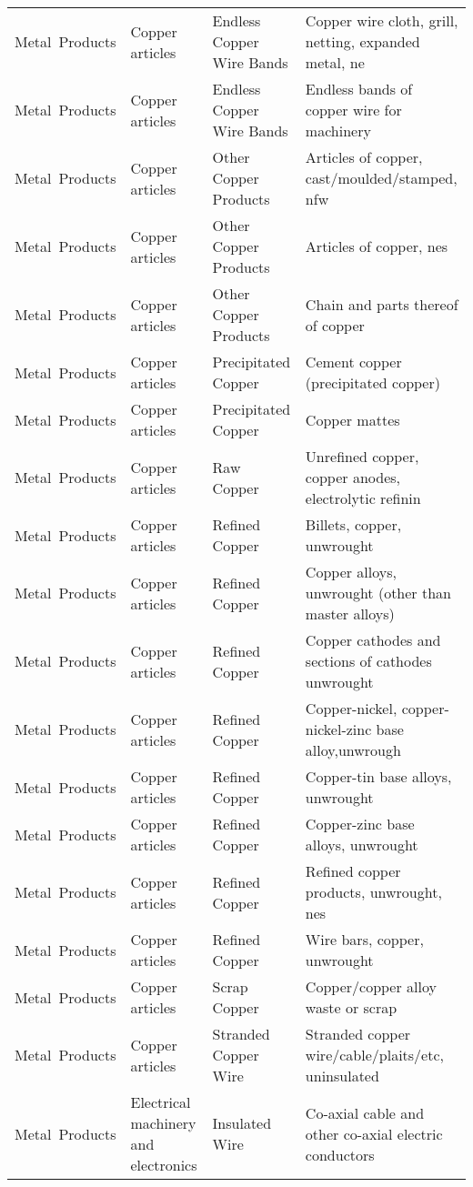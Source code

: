 \begin{appendices}
\begin{xltabular}{\textwidth}{|p{0.10\textwidth}|p{0.25\textwidth}|p{0.20\textwidth}|p{0.35\textwidth}|}
		Metal\ Products & Copper articles & Endless Copper Wire Bands & Copper wire cloth, grill, netting, expanded metal, ne \\
		Metal\ Products & Copper articles & Endless Copper Wire Bands & Endless bands of copper wire for machinery \\
		Metal\ Products & Copper articles & Other Copper Products & Articles of copper, cast/moulded/stamped, nfw \\
		Metal\ Products & Copper articles & Other Copper Products & Articles of copper, nes \\
		Metal\ Products & Copper articles & Other Copper Products & Chain and parts thereof of copper \\
		Metal\ Products & Copper articles & Precipitated Copper & Cement copper (precipitated copper) \\
		Metal\ Products & Copper articles & Precipitated Copper & Copper mattes \\
		Metal\ Products & Copper articles & Raw Copper & Unrefined copper, copper anodes, electrolytic refinin \\
		Metal\ Products & Copper articles & Refined Copper & Billets, copper, unwrought \\
		Metal\ Products & Copper articles & Refined Copper & Copper alloys, unwrought (other than master alloys) \\
		Metal\ Products & Copper articles & Refined Copper & Copper cathodes and sections of cathodes unwrought \\
		Metal\ Products & Copper articles & Refined Copper & Copper-nickel, copper-nickel-zinc base alloy,unwrough \\
		Metal\ Products & Copper articles & Refined Copper & Copper-tin base alloys, unwrought \\
		Metal\ Products & Copper articles & Refined Copper & Copper-zinc base alloys, unwrought \\
		Metal\ Products & Copper articles & Refined Copper & Refined copper products, unwrought, nes \\
		Metal\ Products & Copper articles & Refined Copper & Wire bars, copper, unwrought \\
		Metal\ Products & Copper articles & Scrap Copper & Copper/copper alloy waste or scrap \\
		Metal\ Products & Copper articles & Stranded Copper Wire & Stranded copper wire/cable/plaits/etc, uninsulated \\
		Metal\ Products & Electrical machinery and electronics & Insulated Wire & Co-axial cable and other co-axial electric conductors \\

\end{xltabular}
\end{appendices}
